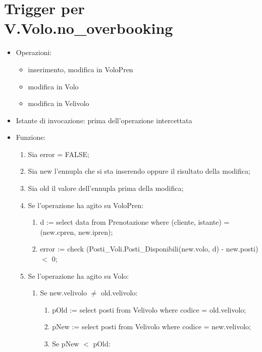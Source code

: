 \documentclass[a4paper,12pt]{report}
\begin{document}
      \section{Trigger per V.Volo.no\_overbooking}
        \begin{itemize}
          \item Operazioni:
            \begin{itemize}
              \item inserimento, modifica in VoloPren
              \item modifica in Volo
              \item modifica in Velivolo
            \end{itemize}
          \item Istante di invocazione: prima dell'operazione intercettata
          \item Funzione:
            \begin{enumerate}[label*=\arabic*.]
              \item Sia error = FALSE;
              \item Sia new l'ennupla che si sta inserendo oppure il risultato della modifica;
              \item Sia old il valore dell'ennupla prima della modifica;
              \item Se l'operazione ha agito su VoloPren:
                \begin{enumerate}[label*=\arabic*.]
                  \item d := select data from Prenotazione where (cliente, istante) = (new.cpren, new.ipren);
                  \item error := check (Posti\_Voli.Posti\_Disponibili(new.volo, d) - new.posti) $<$ 0;
                \end{enumerate}
              \item Se l'operazione ha agito su Volo:
                \begin{enumerate}[label*=\arabic*.]
                  \item Se new.velivolo $\neq$ old.velivolo:
                    \begin{enumerate}[label*=\arabic*.]
                      \item pOld := select posti from Velivolo where codice = old.velivolo;
                      \item pNew := select posti from Velivolo where codice = new.velivolo;
                      \item Se pNew $<$ pOld:

\end{enumerate}
\end{enumerate}
\end{enumerate}
\end{itemize}
\end{document}

